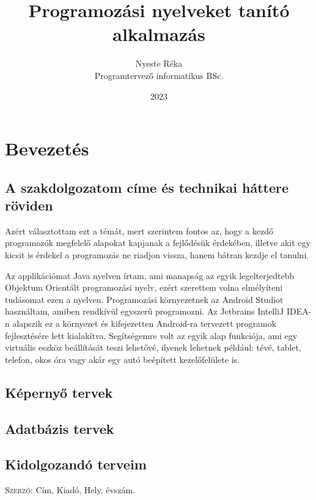 \documentclass{thesis-ekf}
\begin{document}
	\title{Programozási nyelveket tanító alkalmazás}
	\author{Nyeste Réka\\Programtervező informatikus BSc.}
	\date{2023}
	\maketitle
	\tableofcontents
	\chapter{Bevezetés}
	\section{A szakdolgozatom címe és technikai háttere röviden}
	Azért választottam ezt a témát, mert szerintem fontos az, hogy a kezdő programozók megfelelő alapokat kapjanak a fejlődésük érdekében, illetve akit egy kicsit is érdekel a programozás ne riadjon vissza, hanem bátran kezdje el tanulni.
	
	Az applikációmat Java nyelven írtam, ami manapság az egyik legelterjedtebb Objektum Orientált programozási nyelv, ezért szerettem volna elmélyíteni tudásomat ezen a nyelven. Programozási környezetnek az Android Studiot használtam, amiben rendkívül egyszerű programozni. Az Jetbrains IntelliJ IDEA-n alapszik ez a környezet és kifejezetten Android-ra tervezett programok fejlesztésére lett kialakítva. Segítségemre volt az egyik alap funkciója, ami egy virtuális eszköz beállítását teszi lehetővé, ilyenek lehetnek például: tévé, tablet, telefon, okos óra vagy akár egy autó beépített kezelőfelülete is.
	
	
	
	\section{Képernyő tervek}
	\section{Adatbázis tervek}
	\section{Kidolgozandó terveim}
	\begin{thebibliography}{1}
		 \textsc{Szerző}: Cím, Kiadó, Hely, évszám.
	\end{thebibliography}
\end{document}

